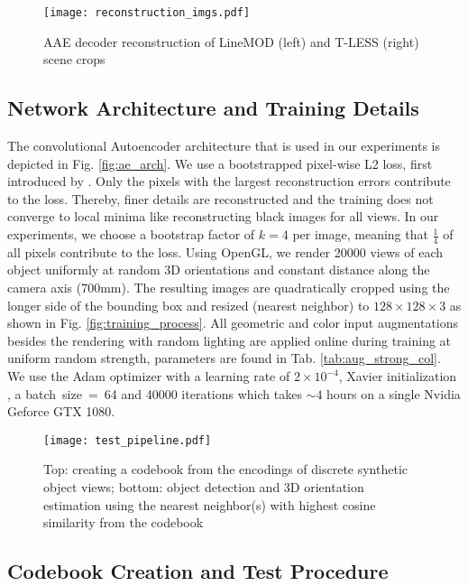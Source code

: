 \begin{figure}[t]\centering
	
	\centering
	\captionsetup{width=0.95\columnwidth}
	\texttt{[image: reconstruction\_imgs.pdf]}
	\caption{\gls{AAE} decoder reconstruction of LineMOD (left) and T-LESS (right) scene crops}
	\label{fig:reconst_ex}
	
\end{figure}
\subsection{Network Architecture and Training Details}

The convolutional Autoencoder architecture that is used in our experiments is depicted in Fig. \ref{fig:ae_arch}. 
We use a bootstrapped pixel-wise L2 loss, first introduced by \cite{wu2016bridging}. Only the pixels with the largest reconstruction errors contribute to the loss. Thereby, finer details are reconstructed and the training does not converge to local minima like reconstructing black images for all views. In our experiments, we choose a bootstrap factor of $k=4$ per image, meaning that $\frac{1}{4}$ of all pixels contribute to the loss.
Using OpenGL, we render 20000 views of each object uniformly at random 3D orientations and constant distance along the camera axis (700mm). The resulting images are quadratically cropped using the longer side of the bounding box and resized (nearest neighbor) to $128 \times 128 \times 3$ as shown in Fig. \ref{fig:training_process}. All geometric and color input augmentations besides the rendering with random lighting are applied online during training at uniform random strength, parameters are found in Tab. \ref{tab:aug_strong_col}.
We use the Adam \citep{kingma2014adam} optimizer with a learning rate of $2\times 10^{-4}$, Xavier initialization \citep{glorot2010understanding}, a \mbox{batch size = 64} and 40000 iterations which takes $\sim 4$ hours on a single Nvidia Geforce GTX 1080.
\begin{figure*}[t]\centering
	\captionsetup{width=0.93\textwidth}
	\texttt{[image: test\_pipeline.pdf]}
	\caption{Top: creating a codebook from the encodings of discrete synthetic object views; bottom: object detection and 3D orientation estimation using the nearest neighbor(s) with highest cosine similarity from the codebook}
	\label{fig:test_pipeline}
\end{figure*}
\subsection{Codebook Creation and Test Procedure}



